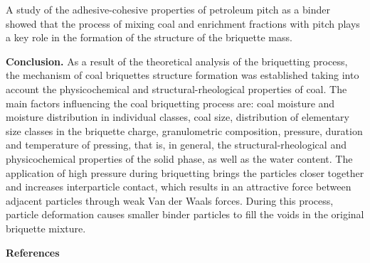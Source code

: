 \begin{multicols}{2}
A study of the adhesive-cohesive properties of petroleum pitch as a
binder showed that the process of mixing coal and enrichment fractions
with pitch plays a key role in the formation of the structure of the
briquette mass.

{\bfseries Conclusion.} As a result of the theoretical analysis of the
briquetting process, the mechanism of coal briquettes structure
formation was established taking into account the physicochemical and
structural-rheological properties of coal. The main factors influencing
the coal briquetting process are: coal moisture and moisture
distribution in individual classes, coal size, distribution of
elementary size classes in the briquette charge, granulometric
composition, pressure, duration and temperature of pressing, that is, in
general, the structural-rheological and physicochemical properties of
the solid phase, as well as the water content. The application of high
pressure during briquetting brings the particles closer together and
increases interparticle contact, which results in an attractive force
between adjacent particles through weak Van der Waals forces. During
this process, particle deformation causes smaller binder particles to
fill the voids in the original briquette mixture.
\end{multicols}

\begin{center}
{\bfseries References}
\end{center}

